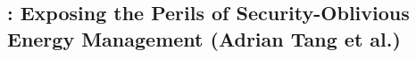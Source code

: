 \subsection{\clkscrew: Exposing the Perils of Security-Oblivious Energy Management (Adrian Tang et al.)}
